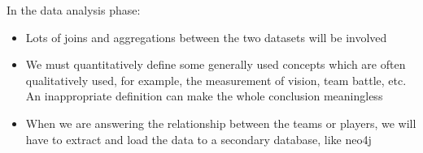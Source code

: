 \documentclass{article}
\begin{document}
In the data analysis phase:

\begin{itemize}
	\item Lots of joins and aggregations between the two datasets will be involved
	\item We must quantitatively define some generally used concepts which are often qualitatively used, for example, the measurement of vision, team battle, etc. An inappropriate definition can make the whole conclusion meaningless
	\item When we are answering the relationship between the teams or players, we will have to extract and load the data to a secondary database, like neo4j
\end{itemize}


\end{document}
